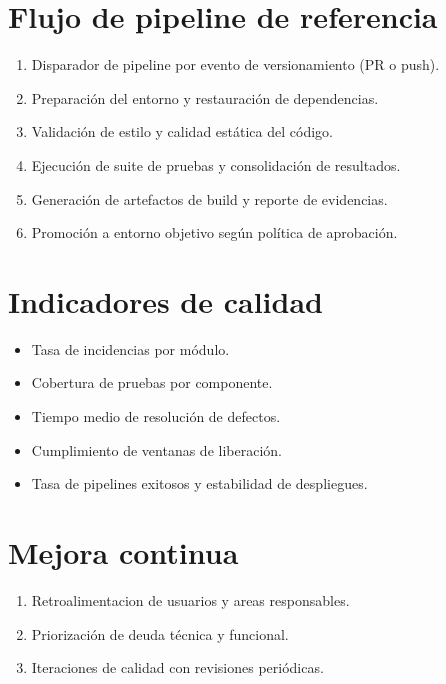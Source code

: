 \section{Flujo de pipeline de referencia}
\begin{enumerate}
  \item Disparador de pipeline por evento de versionamiento (PR o push).
  \item Preparación del entorno y restauración de dependencias.
  \item Validación de estilo y calidad estática del código.
  \item Ejecución de suite de pruebas y consolidación de resultados.
  \item Generación de artefactos de build y reporte de evidencias.
  \item Promoción a entorno objetivo según política de aprobación.
\end{enumerate}

\section{Indicadores de calidad}
\begin{itemize}
  \item Tasa de incidencias por módulo.
  \item Cobertura de pruebas por componente.
  \item Tiempo medio de resolución de defectos.
  \item Cumplimiento de ventanas de liberación.
  \item Tasa de pipelines exitosos y estabilidad de despliegues.
\end{itemize}

\section{Mejora continua}
\begin{enumerate}
  \item Retroalimentacion de usuarios y areas responsables.
  \item Priorización de deuda técnica y funcional.
  \item Iteraciones de calidad con revisiones periódicas.
\end{enumerate}
